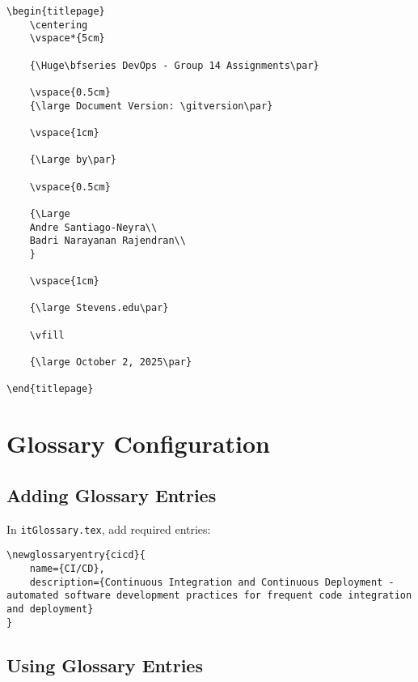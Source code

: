 \begin{verbatim}
\begin{titlepage}
    \centering
    \vspace*{5cm}
    
    {\Huge\bfseries DevOps - Group 14 Assignments\par}
    
    \vspace{0.5cm}
    {\large Document Version: \gitversion\par}
    
    \vspace{1cm}
    
    {\Large by\par}
    
    \vspace{0.5cm}
    
    {\Large
    Andre Santiago-Neyra\\
    Badri Narayanan Rajendran\\
    }
    
    \vspace{1cm}
    
    {\large Stevens.edu\par}
    
    \vfill
    
    {\large October 2, 2025\par}
    
\end{titlepage}
\end{verbatim}

\section{Glossary Configuration}

\subsection{Adding Glossary Entries}

In \texttt{itGlossary.tex}, add required entries:

\begin{verbatim}
\newglossaryentry{cicd}{
    name={CI/CD},
    description={Continuous Integration and Continuous Deployment - automated software development practices for frequent code integration and deployment}
}
\end{verbatim}

\subsection{Using Glossary Entries}

